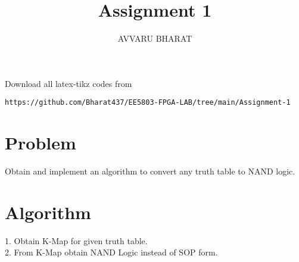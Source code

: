 \documentclass{article}
\begin{document}
     \def\rightbox#1{\makebox[0in][r]{#1}}
     \def\centbox#1{\makebox[0in]{#1}}
     \def\topbox#1{\raisebox{-\baselineskip}[0in][0in]{#1}}
     \def\midbox#1{\raisebox{-0.5\baselineskip}[0in][0in]{#1}}
\vspace{3cm}
\title{Assignment 1}
\author{AVVARU BHARAT}
\date{}
\maketitle
\renewcommand\thefigure{\arabic{figure}}
\setcounter{figure}{0}
\renewcommand{\thetable}{\arabic{table}}
\setcounter{table}{0}
Download all latex-tikz codes from 
%
\begin{lstlisting}
https://github.com/Bharat437/EE5803-FPGA-LAB/tree/main/Assignment-1
\end{lstlisting}
%
\section{Problem}
Obtain and implement an algorithm to convert any truth table to NAND logic.
\section{Algorithm}
1. Obtain K-Map for given truth table.\\
2. From K-Map obtain NAND Logic instead of SOP form.
\end{document}
